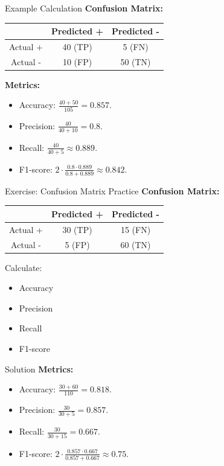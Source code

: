 \documentclass{beamer}
\begin{document}
\begin{frame}{Example Calculation}
  \textbf{Confusion Matrix:}
  \begin{table}[h]
    \centering
    \begin{tabular}{|c|c|c|}
      \hline
      & Predicted + & Predicted - \\
      \hline
      Actual + & 40 (TP) & 5 (FN) \\
      \hline
      Actual - & 10 (FP) & 50 (TN) \\
      \hline
    \end{tabular}
  \end{table}
  \textbf{Metrics:}
  \begin{itemize}
    \item Accuracy: \( \frac{40 + 50}{105} = 0.857 \).
    \item Precision: \( \frac{40}{40 + 10} = 0.8 \).
    \item Recall: \( \frac{40}{40 + 5} \approx 0.889 \).
    \item F1-score: \( 2 \cdot \frac{0.8 \cdot 0.889}{0.8 + 0.889} \approx 0.842 \).
  \end{itemize}
\end{frame}

\begin{frame}{Exercise: Confusion Matrix Practice}
  \textbf{Confusion Matrix:}
  \begin{table}[h]
    \centering
    \begin{tabular}{|c|c|c|}
      \hline
      & Predicted + & Predicted - \\
      \hline
      Actual + & 30 (TP) & 15 (FN) \\
      \hline
      Actual - & 5 (FP) & 60 (TN) \\
      \hline
    \end{tabular}
  \end{table}
  \vspace{0.5em}
  Calculate:
  \begin{itemize}
    \item Accuracy
    \item Precision
    \item Recall
    \item F1-score
  \end{itemize}
\end{frame}

\begin{frame}{Solution}
  \textbf{Metrics:}
  \begin{itemize}
    \item Accuracy: \( \frac{30 + 60}{110} = 0.818 \).
    \item Precision: \( \frac{30}{30 + 5} = 0.857 \).
    \item Recall: \( \frac{30}{30 + 15} = 0.667 \).
    \item F1-score: \( 2 \cdot \frac{0.857 \cdot 0.667}{0.857 + 0.667} \approx 0.75 \).
  \end{itemize}
\end{frame}
\end{document}
